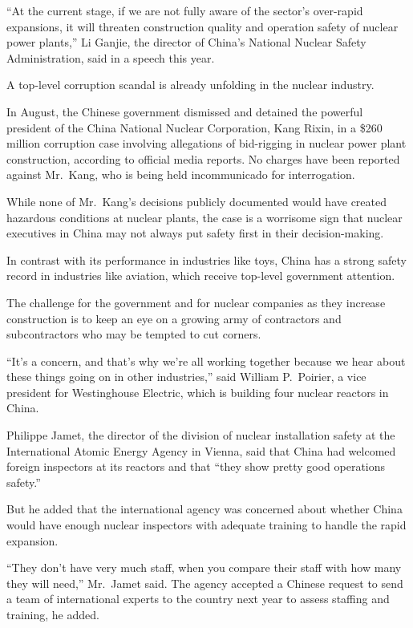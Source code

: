 ﻿\documentclass[12pt]{article}
\begin{document}
``At the current stage, if we are not fully aware of the sector's over-rapid expansions, it will
threaten construction quality and operation safety of nuclear power plants,'' Li Ganjie, the
director of China's National Nuclear Safety Administration, said in a speech this year.

A top-level corruption scandal is already unfolding in the nuclear industry.

In August, the Chinese government dismissed and detained the powerful president of the China
National Nuclear Corporation, Kang Rixin, in a \$260 million corruption case involving allegations
of bid-rigging in nuclear power plant construction, according to official media reports. No charges
have been reported against Mr.~Kang, who is being held incommunicado for interrogation.

While none of Mr.~Kang's decisions publicly documented would have created hazardous conditions at
nuclear plants, the case is a worrisome sign that nuclear executives in China may not always put
safety first in their decision-making.

In contrast with its performance in industries like toys, China has a strong safety record in
industries like aviation, which receive top-level government attention.

The challenge for the government and for nuclear companies as they increase construction is to keep
an eye on a growing army of contractors and subcontractors who may be tempted to cut corners.

``It's a concern, and that's why we're all working together because we hear about these things going
on in other industries,'' said William P.~Poirier, a vice president for Westinghouse Electric, which
is building four nuclear reactors in China.

Philippe Jamet, the director of the division of nuclear installation safety at the International
Atomic Energy Agency in Vienna, said that China had welcomed foreign inspectors at its reactors and
that ``they show pretty good operations safety.''

But he added that the international agency was concerned about whether China would have enough
nuclear inspectors with adequate training to handle the rapid expansion.

``They don't have very much staff, when you compare their staff with how many they will need,''
Mr.~Jamet said. The agency accepted a Chinese request to send a team of international experts to the
country next year to assess staffing and training, he added.
\end{document}
